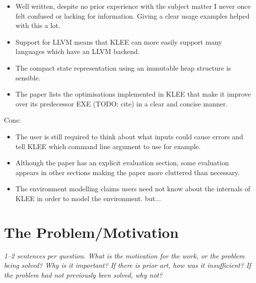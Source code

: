 \documentclass[11pt]{article}
\begin{document}
\begin{itemize}

    \item Well written, despite no prior experience with the subject matter I
    never once felt confused or lacking for information. Giving a clear usage
    examples helped with this a lot.

    \item Support for LLVM means that KLEE can more easily support many
    languages which have an LLVM backend.

    \item The compact state representation using an immutable heap structure
    is sensible.

    \item The paper lists the optimisations implemented in KLEE that make it
    improve over its predecessor EXE (TODO: cite) \cite{EXE} in a clear and
    concise manner.

\end{itemize}

Cons:

\begin{itemize}

    \item The user is still required to think about what inputs could cause
    errors and tell KLEE which command line argument to use for example.

    \item Although the paper has an explicit evaluation section, some
    evaluation appears in other sections making the paper more cluttered than
    necessary.

    \item The environment modelling claims users need not know about the
    internals of KLEE in order to model the environment. but...


\end{itemize}

\section*{The Problem/Motivation}

\textsl{1--2 sentences per question. What is the motivation for the work, or
the problem being solved? Why is it important? If there is prior art, how was
it insufficient? If the problem had not previously been solved, why not?}
\end{document}
